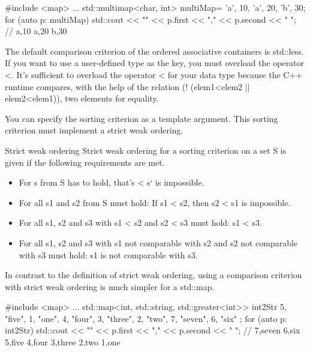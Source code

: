 \begin{cpp}
#include <map>
...
std::multimap<char, int> multiMap= {{'a', 10}, {'a', 20}, {'b', 30}};
for (auto p: multiMap) std::cout << "{" << p.first << "," << p.second << "} ";
				// {a,10} {a,20} {b,30}
\end{cpp}


The default comparison criterion of the ordered associative containers is std::less. If you want to use a user-defined type as the key, you must overload the operator <. It’s sufficient to overload the operator < for your data type because the C++ runtime compares, with the help of the relation (! (elem1<elem2 || elem2<elem1)), two elements for equality.

You can specify the sorting criterion as a template argument. This sorting criterion must implement a strict weak ordering.

\begin{myNotic}{Strict weak ordering}
Strict weak ordering for a sorting criterion on a set S is given if the following requirements are met.

\begin{itemize}
\item 
For s from S has to hold, that’s < s‘ is impossible.

\item 
For all s1 and s2 from S must hold: If s1 < s2, then s2 < s1 is impossible.

\item 
For all s1, s2 and s3 with s1 < s2 and s2 < s3 must hold: s1 < s3.

\item 
For all s1, s2 and s3 with s1 not comparable with s2 and s2 not comparable with s3 must hold: s1 is not comparable with s3.
\end{itemize}
\end{myNotic}

In contrast to the definition of strict weak ordering, using a comparison criterion with strict weak ordering is much simpler for a std::map.

\begin{cpp}
#include <map>
...
std::map<int, std::string, std::greater<int>> int2Str{
	{5, "five"}, {1, "one"}, {4, "four"}, {3, "three"},
	{2, "two"}, {7, "seven"}, {6, "six"} };
for (auto p: int2Str) std::cout << "{" << p.first << "," << p.second << "} ";
	// {7,seven} {6,six} {5,five} {4,four} {3,three} {2,two} {1,one}
\end{cpp}

